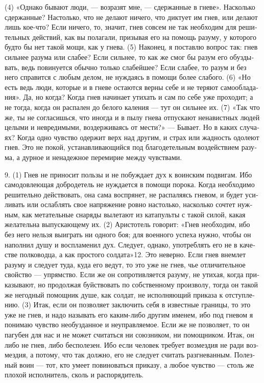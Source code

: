 (4) «Одна­ко быва­ют люди, --- воз­ра­зят мне, --- сдер­жан­ные в гне­ве». Насколь­ко сдер­жан­ные? Настоль­ко, что не дела­ют ниче­го, что дик­ту­ет им гнев, или дела­ют лишь кое-что? Если ниче­го, то, зна­чит, гнев совсем не так необ­хо­дим для реши­тель­ных дей­ст­вий, как вы пола­га­ли, при­зы­вая его на помощь разу­му, у кото­ро­го буд­то бы нет такой мощи, как у гне­ва. (5) Нако­нец, я постав­лю вопрос так: гнев силь­нее разу­ма или сла­бее? Если силь­нее, то как же смог бы разум его обузды­вать, ведь пови­ну­ет­ся обыч­но толь­ко сла­бей­шее? Если сла­бее, то разум и без него спра­вит­ся с любым делом, не нуж­да­ясь в помо­щи более сла­бо­го. (6) «Но есть ведь люди, кото­рые и в гне­ве оста­ют­ся вер­ны себе и не теря­ют само­об­ла­да­ния». Да, но когда? Когда гнев начи­на­ет ути­хать и сам по себе уже про­хо­дит; а не тогда, когда он рас­па­лен до бело­го кале­ния --- тут он силь­нее их. (7) «Так что же, ты не согла­сишь­ся, что ино­гда и в пылу гне­ва отпус­ка­ют нена­вист­ных людей целы­ми и невреди­мы­ми, воз­дер­жи­ва­ясь от мести?» --- Быва­ет. Но в каких слу­ча­ях? Когда одно чув­ство одер­жит верх над дру­гим, и страх или жад­ность одо­ле­ют гнев. Это не покой, уста­нав­ли­ваю­щий­ся под бла­го­де­тель­ным воздей­ст­ви­ем разу­ма, а дур­ное и нена­деж­ное пере­ми­рие меж­ду чув­ства­ми.

9. (1) Гнев не при­но­сит поль­зы и не побуж­да­ет дух к воин­ским подви­гам. Ибо само­до­вле­ю­щая доб­ро­де­тель не нуж­да­ет­ся в помо­щи поро­ка. Когда необ­хо­ди­мо реши­тель­но дей­ст­во­вать, она сама вос­прянет, не рас­па­ля­ясь гне­вом, и будет уси­ли­вать или ослаб­лять свое напря­же­ние ров­но настоль­ко, насколь­ко сочтет нуж­ным, как мета­тель­ные сна­ряды выле­та­ют из ката­пуль­ты с такой силой, какая жела­тель­на выпус­каю­ще­му их. (2) Ари­сто­тель гово­рит: «Гнев необ­хо­дим, ибо без него нель­зя выиг­рать ни одно­го боя; для воен­но­го успе­ха нуж­но, чтобы он напол­нил душу и вос­пла­ме­нил дух. Сле­ду­ет, одна­ко, употреб­лять его не в каче­стве пол­ко­во­д­ца, а как про­сто­го солдата»12. Это невер­но. Если гнев внем­лет разу­му и сле­ду­ет туда, куда его ведут, то это уже не гнев, чье отли­чи­тель­ное свой­ство --- упрям­ство. Если же он сопро­тив­ля­ет­ся разу­му, не ути­хая, когда при­ка­зы­ва­ют, но про­дол­жая буй­ст­во­вать по соб­ст­вен­но­му про­из­во­лу, тогда он такой же негод­ный помощ­ник душе, как сол­дат, не испол­ня­ю­щий при­ка­за к отступ­ле­нию. (3) Итак, если он поз­во­ля­ет заклю­чить себя в извест­ные гра­ни­цы, то это уже не гнев, и надо назы­вать его каким-либо дру­гим име­нем, ибо под гне­вом я пони­маю чув­ство необуздан­ное и неуправ­ля­е­мое. Если же не поз­во­ля­ет, то он пагу­бен для нас и не может счи­тать­ся ни союз­ни­ком, ни помощ­ни­ком. Итак, он либо не гнев, либо бес­по­ле­зен. Ибо если чело­век тре­бу­ет воз­мездия не ради воз­мездия, а пото­му, что так долж­но, его не сле­ду­ет счи­тать раз­гне­ван­ным. Полез­ный воин --- тот, кто уме­ет пови­но­вать­ся при­ка­зу, а любое чув­ство --- столь же пло­хой испол­ни­тель, сколь и рас­по­ряди­тель.

